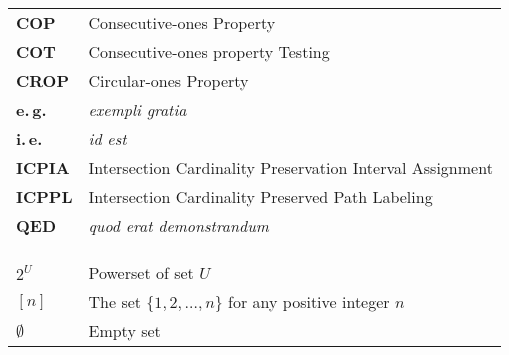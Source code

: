 \xclearpage

\abbreviations

\begin{tabular}{ll}
  \textbf{COP}& Consecutive-ones Property \\
  \textbf{COT}& Consecutive-ones property Testing \\
  \textbf{CROP}& Circular-ones Property \\
  \textbf{e.\,g.}& {\em exempli gratia} \\ 
  \textbf{i.\,e.}& {\em id est}\\
  \textbf{ICPIA}& Intersection Cardinality Preservation Interval
  Assignment \\
  \textbf{ICPPL}& Intersection Cardinality Preserved Path Labeling \\ 
  \textbf{QED}& {\em quod erat demonstrandum}\\

  &\\
  \hline
  &\\
  &\\
  $2^{U}$  & Powerset of set $U$\\
  $[n]$   & The set $\{1,2,\ldots,n\}$ for any positive integer $n$\\
  $\emptyset$ & Empty set
  
\end{tabular}